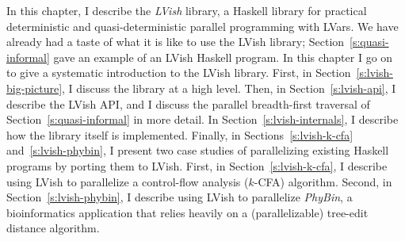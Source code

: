 In this chapter, I describe the \emph{LVish} library, a Haskell
library for practical deterministic and quasi-deterministic parallel
programming with LVars.  We have already had a taste of what it is
like to use the LVish library; Section~\ref{s:quasi-informal} gave an
example of an LVish Haskell program.  In this chapter I go on to give
a systematic introduction to the LVish library.  First, in
Section~\ref{s:lvish-big-picture}, I discuss the library at a high
level.  Then, in Section~\ref{s:lvish-api}, I describe the LVish API,
and I discuss the parallel breadth-first traversal of
Section~\ref{s:quasi-informal} in more detail.  In
Section~\ref{s:lvish-internals}, I describe how the library itself is
implemented.  Finally, in Sections~\ref{s:lvish-k-cfa}
and~\ref{s:lvish-phybin}, I present two case studies of parallelizing
existing Haskell programs by porting them to LVish.  First, in
Section~\ref{s:lvish-k-cfa}, I describe using LVish to parallelize a
control-flow analysis ($k$-CFA) algorithm.  Second, in
Section~\ref{s:lvish-phybin}, I describe using LVish to parallelize
\emph{PhyBin}, a bioinformatics application that relies heavily on a
(parallelizable) tree-edit distance algorithm.
